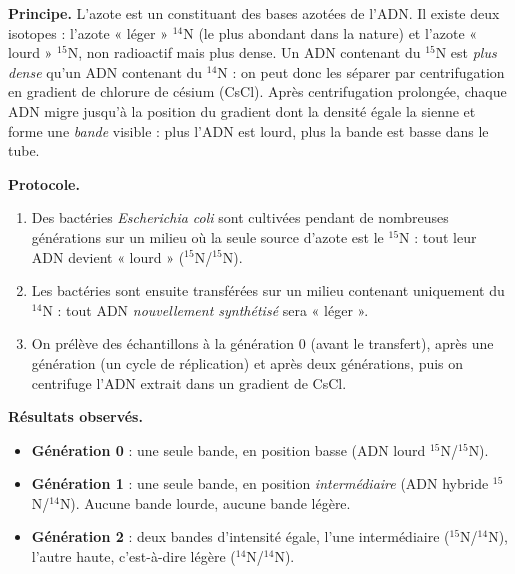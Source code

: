 \documentclass[11pt]{article}
\newcommand{\cle}[1]{{\popxbold\color{popdark}#1}}
\begin{document}
\begin{experience}
\textbf{Principe.} L'azote est un constituant des bases azotées de l'ADN. Il existe deux isotopes : l'azote « léger » $^{14}$N (le plus abondant dans la nature) et l'azote « lourd » $^{15}$N, non radioactif mais plus dense. Un ADN contenant du $^{15}$N est \emph{plus dense} qu'un ADN contenant du $^{14}$N : on peut donc les séparer par \cle{centrifugation en gradient de chlorure de césium} (CsCl). Après centrifugation prolongée, chaque ADN migre jusqu'à la position du gradient dont la densité égale la sienne et forme une \emph{bande} visible : plus l'ADN est lourd, plus la bande est basse dans le tube.

\textbf{Protocole.}
\begin{enumerate}
\item Des bactéries \emph{Escherichia coli} sont cultivées pendant de nombreuses générations sur un milieu où la seule source d'azote est le $^{15}$N : tout leur ADN devient « lourd » ($^{15}$N/$^{15}$N).
\item Les bactéries sont ensuite transférées sur un milieu contenant uniquement du $^{14}$N : tout ADN \emph{nouvellement synthétisé} sera « léger ».
\item On prélève des échantillons à la génération 0 (avant le transfert), après une génération (un cycle de réplication) et après deux générations, puis on centrifuge l'ADN extrait dans un gradient de CsCl.
\end{enumerate}

\textbf{Résultats observés.}
\begin{itemize}
\item \textbf{Génération 0} : une seule bande, en position basse (ADN lourd $^{15}$N/$^{15}$N).
\item \textbf{Génération 1} : une seule bande, en position \emph{intermédiaire} (ADN hybride $^{15}$N/$^{14}$N). Aucune bande lourde, aucune bande légère.
\item \textbf{Génération 2} : deux bandes d'intensité égale, l'une intermédiaire ($^{15}$N/$^{14}$N), l'autre haute, c'est-à-dire légère ($^{14}$N/$^{14}$N).
\end{itemize}
\end{experience}
\end{document}
